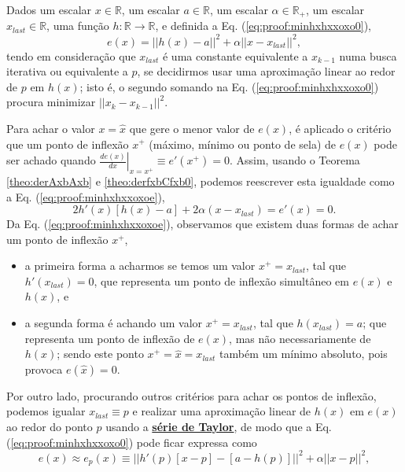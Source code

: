 \begin{myproofT}\label{proof:theo:minhxhxaxoxo}

Dados
um escalar $x \in \mathbb{R}$, 
um escalar $a \in \mathbb{R}$,
um escalar $\alpha \in \mathbb{R}_{+}$,
um escalar $x_{last} \in \mathbb{R}$,
uma função $h:\mathbb{R} \rightarrow \mathbb{R}$, e 
definida a Eq. (\ref{eq:proof:minhxhxxoxo0}),
\begin{equation}\label{eq:proof:minhxhxxoxo0}
e(x)=||h(x)-a||^2+\alpha ||x-x_{last}||^2,
\end{equation}
tendo em consideração que $x_{last}$ é uma constante equivalente a $x_{k-1}$
numa busca iterativa ou equivalente a $p$, 
se decidirmos usar uma aproximação linear ao redor de $p$ em $h(x)$; 
isto é, o segundo somando na Eq. (\ref{eq:proof:minhxhxxoxo0}) 
procura minimizar $||x_{k}-x_{k-1}||^2$.


Para achar o valor  $x=\hat{x}$ que gere o menor valor de $e(x)$, é aplicado
o critério que um ponto de inflexão $x^+$ (máximo, mínimo ou ponto de sela) de $e(x)$ 
pode ser achado quando 
$\left. \frac{d e(x)}{d x }\right|_{x=x^+} \equiv e'(x^+) =0$.
Assim, 
usando o Teorema \ref{theo:derAxbAxb} e \ref{theo:derfxbCfxb0}, podemos 
reescrever esta igualdade como a Eq. (\ref{eq:proof:minhxhxxoxoe}),
\begin{equation}\label{eq:proof:minhxhxxoxoe}
2  h'(x) \left[h(x) -a\right]+2\alpha (x-x_{last})= e'(x)=0.
\end{equation}
Da Eq. (\ref{eq:proof:minhxhxxoxoe}), observamos 
que existem duas formas de achar um ponto de inflexão $x^+$,
\begin{itemize}
 \item a primeira forma a acharmos se temos um valor $x^+=x_{last}$, tal que $h'(x_{last})=0$, 
que representa um ponto de inflexão simultâneo em $e(x)$ e $h(x)$, e
 \item a segunda forma é achando um valor $x^+=x_{last}$, tal que $h(x_{last})=a$;
que representa um ponto de inflexão de $e(x)$, mas não
necessariamente de $h(x)$; 
sendo este ponto $x^+=\hat{x}=x_{last}$ também um mínimo absoluto, pois provoca $e(\hat{x})=0$.
\end{itemize}

Por outro lado, procurando outros critérios para achar os pontos de inflexão,
podemos igualar $x_{last}\equiv p$ e 
realizar uma aproximação linear de $h(x)$ em $e(x)$
ao redor do ponto $p$ usando a \hyperref[def:taylor]{\textbf{série de Taylor}},
de modo que a Eq. (\ref{eq:proof:minhxhxxoxo0}) pode ficar expressa como
\begin{equation}\label{eq:proof:minhxhxxoxo0approx}
e(x) \approx e_{p}(x)  \equiv ||h'(p)[x-p]-[a-h(p)]||^2+\alpha||x-p||^2,
\end{equation}



\end{myproofT}
